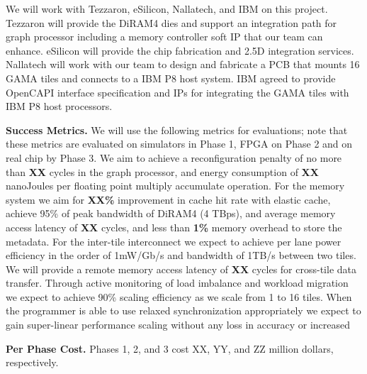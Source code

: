 We will work with Tezzaron, eSilicon, Nallatech, and IBM on this project. 
Tezzaron will provide the DiRAM4 dies and support an integration path for graph processor including a memory controller soft IP that our team can enhance.
eSilicon will provide the chip fabrication and 2.5D integration services.
Nallatech will work with our team to design and fabricate a PCB that mounts 16 GAMA tiles and connects to a IBM P8 host system.
IBM agreed to provide OpenCAPI interface specification and IPs for integrating the GAMA tiles with IBM P8 host processors. 

\vspace{3pt}
\noindent
\textbf{Success Metrics.} 
We will use the following metrics for evaluations; note that these metrics are evaluated on simulators in Phase 1, FPGA on Phase 2 and on real chip by Phase 3.  
We aim to achieve a reconfiguration penalty of no more than \textbf{XX} cycles in the graph processor, and energy consumption of \textbf{XX} nanoJoules per floating point multiply accumulate operation. 
For the memory system we aim for \textbf{XX\%} improvement in cache hit rate with elastic cache, achieve 95\% of peak bandwidth of DiRAM4 (4 TBps), and average memory access latency of \textbf{XX} cycles, and less than \textbf{1\%} memory overhead to store the metadata.
For the inter-tile interconnect we expect to achieve per lane power efficiency in the order of 1mW/Gb/s and bandwidth of 1TB/s between two tiles. We will provide a remote memory access latency of \textbf{XX} cycles for cross-tile data transfer. 
Through active monitoring of load imbalance and workload migration we expect to achieve 90\% scaling efficiency as we scale from 1 to 16 tiles. 
When the programmer is able to use relaxed synchronization appropriately we expect to gain super-linear performance scaling without any loss in accuracy or increased  


\vspace{3pt}
\noindent
\textbf{Per Phase Cost.} 
Phases 1, 2, and 3 cost XX, YY, and ZZ million dollars, respectively.

